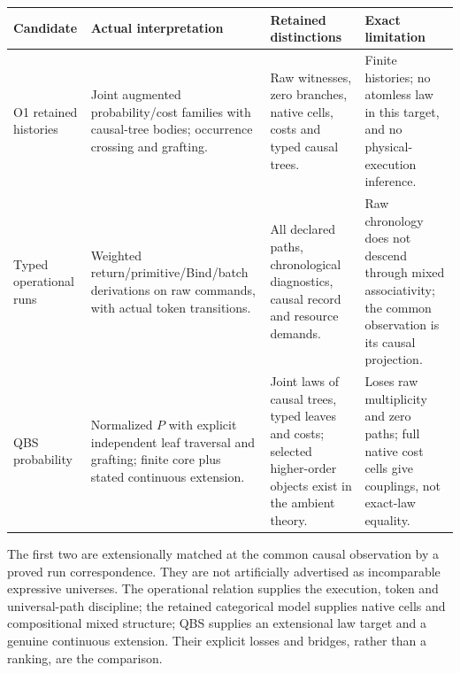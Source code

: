\documentclass[11pt,a4paper]{article}
\theoremstyle{definition}
\begin{document}
\begin{longtable}{@{}p{.20\linewidth}p{.25\linewidth}p{.25\linewidth}p{.22\linewidth}@{}}
\toprule
Candidate&Actual interpretation&Retained distinctions&Exact limitation\\
\midrule\endhead
O1 retained histories&Joint augmented probability/cost families with
causal-tree bodies; occurrence crossing and grafting.&Raw witnesses,
zero branches, native cells, costs and typed causal trees.&Finite histories;
no atomless law in this target, and no physical-execution inference.\\
Typed operational runs&Weighted return/primitive/Bind/batch derivations on
raw commands, with actual token transitions.&All declared paths,
chronological diagnostics, causal record and resource demands.&Raw chronology
does not descend through mixed associativity; the common observation is
its causal projection.\\
QBS probability&Normalized $P$ with explicit independent leaf traversal and
grafting; finite core plus stated continuous extension.&Joint laws of
causal trees, typed leaves and costs; selected higher-order objects exist
in the ambient theory.&Loses raw multiplicity and zero paths; full native
cost cells give couplings, not exact-law equality.\\
\bottomrule
\end{longtable}
The first two are extensionally matched at the common causal observation by
a proved run correspondence. They are not artificially advertised as
incomparable expressive universes. The operational relation supplies the
execution, token and universal-path discipline; the retained categorical
model supplies native cells and compositional mixed structure; QBS supplies
an extensional law target and a genuine continuous extension. Their explicit
losses and bridges, rather than a ranking, are the comparison.
\end{document}
